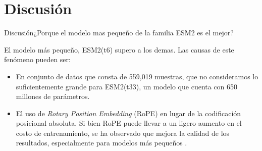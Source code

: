 \documentclass[10pt]{beamer}
\newcommand{\1}{
	\setbeamertemplate{background}{
		\texttt{[image: img/1]}
		\tikz[overlay] \fill[fill opacity=0.75,fill=white] (0,0) rectangle (-\paperwidth,\paperheight);
	}
}
\begin{document}
\section{Discusión}




\begin{frame}{Discusión}{¿Porque el modelo mas pequeño de la familia ESM2 es el mejor?}
	
	\begin{block}{}
		El modelo más pequeño, ESM2(t6) supero a los demas. Las causas de este fenómeno pueden ser: 
	
	\end{block}
	
	\pause
	
	\begin{block}{}
		\begin{itemize}
			\item En conjunto de datos que consta de 559,019 muestras, que no consideramos lo suficientemente grande para ESM2(t33), un modelo que cuenta con 650 millones de parámetros. \pause
			
			\item El uso de \textit{Rotary Position Embedding} (RoPE) en lugar de la codificación posicional absoluta. Si bien RoPE puede llevar a un ligero aumento en el costo de entrenamiento, se ha observado que mejora la calidad de los resultados, especialmente para modelos más pequeños \cite{lin2023evolutionary}.
		\end{itemize}
	\end{block}
	
\end{frame}

	
	
\end{document}
